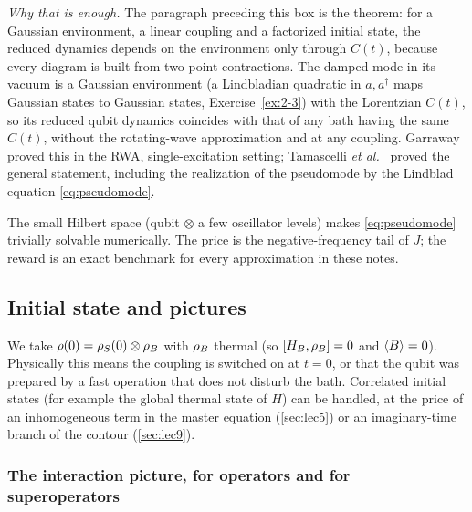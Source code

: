 \begin{keybox}
\emph{Why that is enough.}
The paragraph preceding this box is the theorem: for a Gaussian environment, a linear coupling and a factorized initial state, the reduced dynamics depends on the environment only through $C(t)$, because every diagram is built from two-point contractions.
The damped mode in its vacuum is a Gaussian environment (a Lindbladian quadratic in $a,a^\dagger$ maps Gaussian states to Gaussian states, Exercise~\ref{ex:2-3}) with the Lorentzian $C(t)$, so its reduced qubit dynamics coincides with that of any bath having the same $C(t)$, without the rotating-wave approximation and at any coupling.
Garraway proved this in the RWA, single-excitation setting; Tamascelli \emph{et al.}~\cite{Tamascelli2018} proved the general statement, including the realization of the pseudomode by the Lindblad equation \eqref{eq:pseudomode}.

The small Hilbert space (qubit $\otimes$ a few oscillator levels) makes \cref{eq:pseudomode} trivially solvable numerically.
The price is the negative-frequency tail of $J$; the reward is an exact benchmark for every approximation in these notes.
\end{keybox}

\subsection{Initial state and pictures}

We take $\rho(0)=\rho_{S}(0)\otimes\rho_{B}$ with $\rho_{B}$ thermal (so $[H_B,\rho_{B}]=0$ and $\langle B\rangle=0$).
Physically this means the coupling is switched on at $t=0$, or that the qubit was prepared by a fast operation that does not disturb the bath.
Correlated initial states (for example the global thermal state of $H$) can be handled, at the price of an inhomogeneous term in the master equation (\cref{sec:lec5}) or an imaginary-time branch of the contour (\cref{sec:lec9}).

\subsubsection{The interaction picture, for operators and for superoperators}
\label{sec:pictures}

